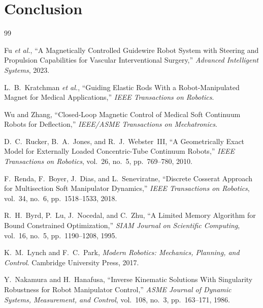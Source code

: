 \documentclass[journal]{IEEEtran}
\begin{document}
\section{Conclusion}
\label{sec:conclusion}

\begin{thebibliography}{99}

Fu \emph{et al.}, ``A Magnetically Controlled Guidewire Robot System with
Steering and Propulsion Capabilities for Vascular Interventional
Surgery,'' \emph{Advanced Intelligent Systems}, 2023.

L.~B.~Kratchman \emph{et al.}, ``Guiding Elastic Rods With a
Robot-Manipulated Magnet for Medical Applications,'' \emph{IEEE
Transactions on Robotics}.

Wu and Zhang, ``Closed-Loop Magnetic Control of Medical Soft Continuum
Robots for Deflection,'' \emph{IEEE/ASME Transactions on Mechatronics}.

D.~C.~Rucker, B.~A.~Jones, and R.~J.~Webster~III, ``A Geometrically Exact
Model for Externally Loaded Concentric-Tube Continuum Robots,'' \emph{IEEE
Transactions on Robotics}, vol.~26, no.~5, pp.~769--780, 2010.

F.~Renda, F.~Boyer, J.~Dias, and L.~Seneviratne, ``Discrete Cosserat
Approach for Multisection Soft Manipulator Dynamics,'' \emph{IEEE
Transactions on Robotics}, vol.~34, no.~6, pp.~1518--1533, 2018.

R.~H.~Byrd, P.~Lu, J.~Nocedal, and C.~Zhu, ``A Limited Memory Algorithm
for Bound Constrained Optimization,'' \emph{SIAM Journal on Scientific
Computing}, vol.~16, no.~5, pp.~1190--1208, 1995.

K.~M.~Lynch and F.~C.~Park, \emph{Modern Robotics: Mechanics, Planning,
and Control}. Cambridge University Press, 2017.

Y.~Nakamura and H.~Hanafusa, ``Inverse Kinematic Solutions With
Singularity Robustness for Robot Manipulator Control,'' \emph{ASME Journal
of Dynamic Systems, Measurement, and Control}, vol.~108, no.~3,
pp.~163--171, 1986.


\end{thebibliography}
\end{document}
